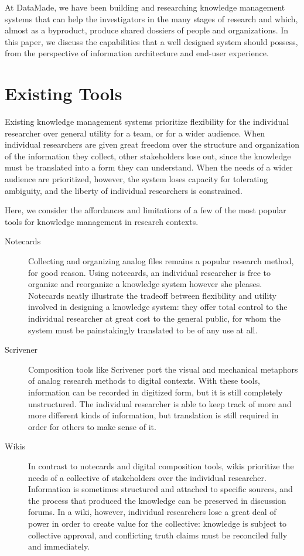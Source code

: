 \documentclass[format=siggraph, review=true]{acmart}
\begin{document}
At DataMade, we have been building and researching knowledge
management systems that can help the investigators in the many stages of
research and which, almost as a byproduct, produce shared dossiers of
people and organizations. In this paper, we discuss the capabilities
that a well designed system should possess, from the perspective of information architecture and end-user experience.

\section{Existing Tools}
Existing knowledge management systems prioritize flexibility for the
individual researcher over general utility for a team, or for a wider
audience. When individual researchers are given great freedom over the
structure and organization of the information they collect, other
stakeholders lose out, since the knowledge must be translated into a form
they can understand. When the needs of a wider audience are prioritized,
however, the system loses capacity for tolerating ambiguity, and the
liberty of individual researchers is constrained.

Here, we consider the affordances and limitations of a few of the most
popular tools for knowledge management in research contexts.

\begin{description}
  \item [Notecards] Collecting and organizing analog files remains
    a popular research method, for good reason. Using notecards, an
    individual researcher is free to organize and reorganize a
    knowledge system however she pleases. Notecards neatly illustrate
    the tradeoff between flexibility and utility involved in designing
    a knowledge system: they offer total control to the individual
    researcher at great cost to the general public, for whom the system
    must be painstakingly translated to be of any use at all.

  \item [Scrivener] Composition tools like Scrivener port the visual
    and mechanical metaphors of analog research methods to digital
    contexts. With these tools, information can be recorded in digitized
    form, but it is still completely unstructured. The individual
    researcher is able to keep track of more and more different kinds
    of information, but translation is still required in order for others
    to make sense of it.

  \item [Wikis] In contrast to notecards and digital composition tools,
    wikis prioritize the needs of a collective of stakeholders over the
    individual researcher. Information is sometimes structured and
    attached to specific sources, and the process that produced the
    knowledge can be preserved in discussion forums. In a wiki, however,
    individual researchers lose a great deal of power in order to create
    value for the collective: knowledge is subject to collective approval,
    and conflicting truth claims must be reconciled fully and immediately.
\end{description}
\end{document}
